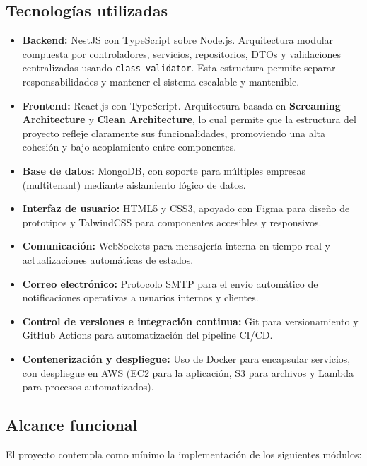 \subsection*{Tecnologías utilizadas}

\begin{itemize}
	\item \textbf{Backend:} NestJS con TypeScript sobre Node.js. Arquitectura modular compuesta por controladores, servicios, repositorios, DTOs y validaciones centralizadas usando \texttt{class-validator}. Esta estructura permite separar responsabilidades y mantener el sistema escalable y mantenible.
	\item \textbf{Frontend:} React.js con TypeScript. Arquitectura basada en \textbf{Screaming Architecture} y \textbf{Clean Architecture}, lo cual permite que la estructura del proyecto refleje claramente sus funcionalidades, promoviendo una alta cohesión y bajo acoplamiento entre componentes.
	\item \textbf{Base de datos:} MongoDB, con soporte para múltiples empresas (multitenant) mediante aislamiento lógico de datos.
	\item \textbf{Interfaz de usuario:} HTML5 y CSS3, apoyado con Figma para diseño de prototipos y TalwindCSS para componentes accesibles y responsivos.
	\item \textbf{Comunicación:} WebSockets para mensajería interna en tiempo real y actualizaciones automáticas de estados.
	\item \textbf{Correo electrónico:} Protocolo SMTP para el envío automático de notificaciones operativas a usuarios internos y clientes.
	\item \textbf{Control de versiones e integración continua:} Git para versionamiento y GitHub Actions para automatización del pipeline CI/CD.
	\item \textbf{Contenerización y despliegue:} Uso de Docker para encapsular servicios, con despliegue en AWS (EC2 para la aplicación, S3 para archivos y Lambda para procesos automatizados).
\end{itemize}


\subsection*{Alcance funcional}

El proyecto contempla como mínimo la implementación de los siguientes módulos:

